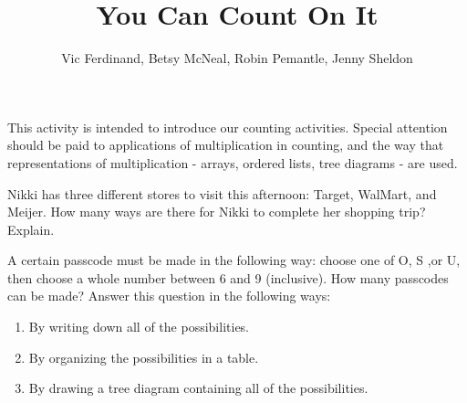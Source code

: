 \documentclass{ximera}
\title{You Can Count On It}
\author{Vic Ferdinand, Betsy McNeal, Robin Pemantle, Jenny Sheldon}
\begin{document}
\begin{abstract}
\end{abstract}
\maketitle

\begin{instructorIntro}
This activity is intended to introduce our counting activities.  Special attention should be paid to applications of multiplication in counting, and the way that representations of multiplication - arrays, ordered lists, tree diagrams - are used.
\end{instructorIntro}

\begin{problem}
Nikki has three different stores to visit this afternoon: Target, WalMart, and Meijer.  How many ways are there for Nikki to complete her shopping trip?  Explain.
\end{problem}





\begin{problem}
A certain passcode must be made in the following way: choose one of O, S ,or U, then choose a whole number between 6 and 9 (inclusive).  How many passcodes can be made?  Answer this question in the following ways:
\begin{enumerate}
\item By writing down all of the possibilities.
\item By organizing the possibilities in a table.
\item By drawing a tree diagram containing all of the possibilities.
\end{enumerate}
\end{problem}
\end{document}
